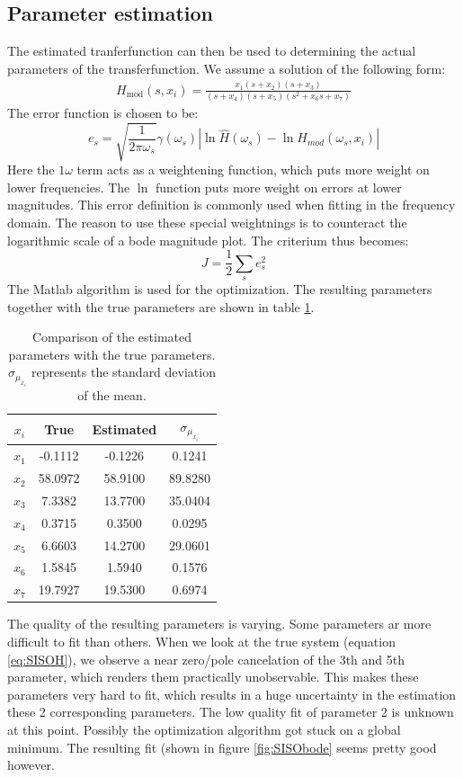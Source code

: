 \subsection{Parameter estimation}
The estimated tranferfunction can then be used to determining the actual parameters of the transferfunction. We assume a solution of the following form:
	\begin{align}
		H_{\textrm{mod}}(s,x_i) = \frac{ x_1 (s+x_2) (s+x_3)  }{ (s+x_4) (s+x_5) (s^2 + x_6s + x_7) } 
	\end{align}
The error function is chosen to be:
		\begin{equation}
		e_s = \sqrt{\frac{1}{2\pi\omega_s}}\gamma(\omega_s)\left|\ln \hat{H}(\omega_s)-\ln H_{mod}(\omega_s,x_i)\right|
		\end{equation}
Here the $1\omega$ term acts as a weightening function, which puts more weight on lower frequencies. The $\ln$ function puts more weight on errors at lower magnitudes. This error definition is commonly used when fitting in the frequency domain. The reason to use these special weightnings is to counteract the logarithmic scale of a bode magnitude plot.
The criterium thus becomes:
		\begin{equation}
		J = \frac{1}{2}\sum_{s} e_s^2
		\end{equation}	
The Matlab  algorithm is used for the optimization. The resulting parameters together with the true parameters are shown in table \ref{table:SISOparms}.
\begin{table}
\centering
		\begin{tabular}{cccc}
		\toprule
		$x_i$ & True & Estimated & $\sigma_{\mu_{x_i}}$ \\
		\midrule
		$x_1$&   -0.1112  	& -0.1226  	&  0.1241\\
		$x_2$&	58.0972   	&58.9100  	& 89.8280\\
    $x_3$&	7.3382   		&13.7700  	& 35.0404\\
    $x_4$&	0.3715   		& 0.3500  		&  0.0295\\
    $x_5$&	6.6603   		&14.2700  	& 29.0601\\
    $x_6$&	1.5845    	&1.5940  		&  0.1576\\
		$x_7$&	19.7927  	&19.5300 		&   0.6974\\
		\bottomrule
 		\end{tabular}
		\caption{Comparison of the estimated parameters with the true parameters. $\sigma_{\mu_{x_i}}$ represents the standard deviation of the mean.}
		\label{table:SISOparms}
\end{table}
The quality of the resulting parameters is varying. Some parameters ar more difficult to fit than others. When we look at the true system (equation \ref{eq:SISOH}), we observe a near zero/pole cancelation of the 3th and 5th parameter, which renders them practically unobservable. This makes these parameters very hard to  fit, which results in a huge uncertainty in the estimation these 2 corresponding parameters. The low quality fit of parameter 2 is unknown at this point. Possibly the optimization algorithm got stuck on a global minimum. The resulting fit (shown in figure \ref{fig:SISObode} seems pretty good however.